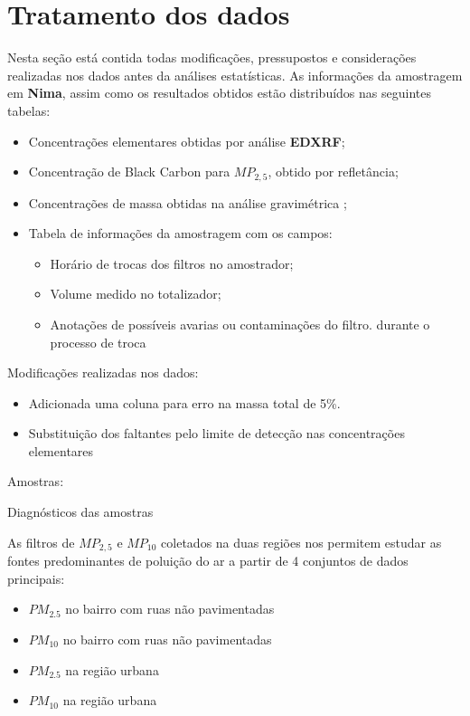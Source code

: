 \section{Tratamento dos dados}

Nesta seção está contida todas modificações, pressupostos e considerações 
realizadas nos dados antes da análises estatísticas.
As informações da amostragem em \textbf{Nima}, assim como os resultados obtidos
estão distribuídos nas seguintes tabelas: 

\begin{itemize}
  \item Concentrações elementares obtidas por análise \textbf{EDXRF};
  \item Concentração de Black Carbon para $MP_{2,5}$, obtido por refletância;
  \item Concentrações de massa obtidas na análise gravimétrica ;
  \item Tabela de informações da amostragem com os campos:
  \begin{itemize}
    \item Horário de trocas dos filtros no amostrador;
    \item Volume medido no totalizador;
    \item Anotações de possíveis avarias ou contaminações do filtro.
          durante o processo de troca
  \end{itemize}
\end{itemize}

Modificações realizadas nos dados:
\begin{itemize}
\item Adicionada uma coluna para erro na massa total de 5\%.
\item Substituição dos faltantes pelo limite de detecção nas 
      concentrações elementares
\end{itemize}

Amostras:
\begin{table}[H]
  \centering
  
  \caption{Diagnósticos das amostras}
\end{table}

As filtros de $MP_{2,5}$ e $MP_{10}$ coletados na duas regiões nos permitem 
estudar as fontes predominantes de poluição do ar a partir de 4 
conjuntos de dados principais: 

\begin{itemize}
  \item $PM_{2.5}$ no bairro com ruas não pavimentadas
  \item $PM_{10}$ no bairro com ruas não pavimentadas
  \item $PM_{2.5}$ na região urbana
  \item $PM_{10}$ na região urbana
\end{itemize}

